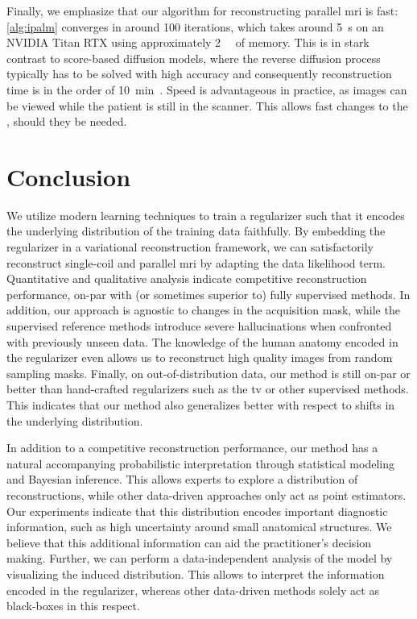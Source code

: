 \documentclass[twocolumn]{article}
\begin{document}
Finally, we emphasize that our algorithm for reconstructing parallel \gls{mri} is fast:
\cref{alg:ipalm} converges in around \num{100} iterations, which takes around \qty{5}{\second} on an NVIDIA Titan RTX using approximately \qty{2}{\giga\byte} of memory.
This is in stark contrast to score-based diffusion models, where the reverse diffusion process typically has to be solved with high accuracy and consequently reconstruction time is in the order of \qty{10}{\minute}~\cite{chung_scoremri_2022}.
Speed is advantageous in practice, as images can be viewed while the patient is still in the scanner.
This allows fast changes to the , should they be needed.
\section{Conclusion}
We utilize modern  learning techniques to train a regularizer such that it encodes the underlying distribution of the training data faithfully.
By embedding the regularizer in a variational reconstruction framework, we can satisfactorily reconstruct single-coil and parallel \gls{mri} by adapting the data likelihood term.
Quantitative and qualitative analysis indicate competitive reconstruction performance, on-par with (or sometimes superior to) fully supervised methods.
In addition, our approach is agnostic to changes in the acquisition mask, while the supervised reference methods introduce severe hallucinations when confronted with previously unseen data.
The knowledge of the human anatomy encoded in the regularizer even allows us to reconstruct high quality images from random sampling masks.
Finally, on out-of-distribution data, our method is still on-par or better than hand-crafted regularizers such as the \gls{tv} or other supervised methods.
This indicates that our method also generalizes better with respect to shifts in the underlying distribution.

In addition to a competitive reconstruction performance, our method has a natural accompanying probabilistic interpretation through statistical modeling and Bayesian inference.
This allows experts to explore a distribution of reconstructions, while other data-driven approaches only act as point estimators.
Our experiments indicate that this distribution encodes important diagnostic information, such as high uncertainty around small anatomical structures.
We believe that this additional information can aid the practitioner's decision making.
Further, we can perform a data-independent analysis of the model by visualizing the induced distribution.
This allows to interpret the information encoded in the regularizer, whereas other data-driven methods solely act as black-boxes in this respect.
\end{document}
